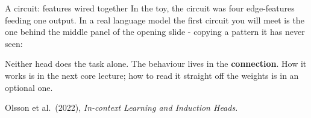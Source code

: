 \documentclass[aspectratio=169]{beamer}
\begin{document}
\begin{frame}{A circuit: features wired together}
  \vspace{0.6em}
  In the toy, the circuit was four edge-features feeding one output. In a real language model the
  first circuit you will meet is the one behind the middle panel of the opening slide - copying a
  pattern it has never seen:

  \vspace{0.8em}
  \begin{center}
  \end{center}

  \vspace{0.8em}
  Neither head does the task alone. The behaviour lives in the \textbf{connection}. How it works is
  in the next core lecture; how to read it straight off the weights is in an optional one.

  \vspace{0.4em}
  {\footnotesize Olsson et al.\ (2022), \emph{In-context Learning and Induction Heads}.}
\end{frame}
\end{document}
